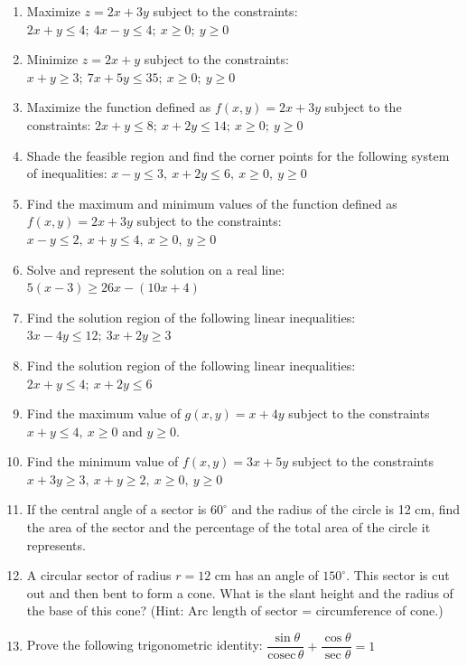 \documentclass[11pt]{article}
\begin{document}
\begin{enumerate}[leftmargin=1.8cm,start=99]
\item Maximize $z=2x+3y$ subject to the constraints: $2x+y\leq4;\ 4x-y\leq4;\ x\geq0;\ y\geq0$

\item Minimize $z=2x+y$ subject to the constraints: $x+y\geq3;\ 7x+5y\leq35;\ x\geq0;\ y\geq0$

\item Maximize the function defined as $f(x,y)=2x+3y$ subject to the constraints: $2x+y\leq8;\ x+2y\leq14;\ x\geq0;\ y\geq0$

\item Shade the feasible region and find the corner points for the following system of inequalities: $x-y\leq3,\ x+2y\leq6,\ x\geq0,\ y\geq0$

\item Find the maximum and minimum values of the function defined as $f(x,y)=2x+3y$ subject to the constraints: $x-y\leq2,\ x+y\leq4,\ x\geq0,\ y\geq0$

\item Solve and represent the solution on a real line: $5(x-3)\geq26x-(10x+4)$

\item Find the solution region of the following linear inequalities: $3x-4y\leq12;\ 3x+2y\geq3$

\item Find the solution region of the following linear inequalities: $2x+y\leq4;\ x+2y\leq6$

\item Find the maximum value of $g(x,y)=x+4y$ subject to the constraints $x+y\leq4,\ x\geq0$ and $y\geq0$.

\item Find the minimum value of $f(x,y)=3x+5y$ subject to the constraints $x+3y\geq3,\ x+y\geq2,\ x\geq0,\ y\geq0$

\item If the central angle of a sector is $60^{\circ}$ and the radius of the circle is 12 cm, find the area of the sector and the percentage of the total area of the circle it represents.

\item A circular sector of radius $r=12$ cm has an angle of $150^{\circ}$. This sector is cut out and then bent to form a cone. What is the slant height and the radius of the base of this cone? (Hint: Arc length of sector = circumference of cone.)

\item Prove the following trigonometric identity: $\dfrac{\sin\theta}{\text{cosec}\,\theta}+\dfrac{\cos\theta}{\sec\theta}=1$

\end{enumerate}
\end{document}
